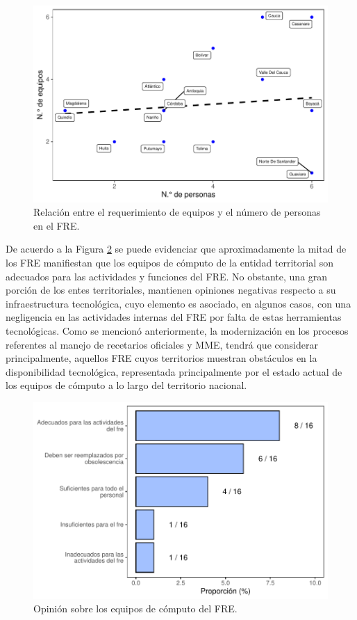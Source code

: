 \documentclass[
  oneside]{book}
\begin{document}
\begin{figure}

{\centering \includegraphics[width=0.85\linewidth]{InformeFinal_files/figure-latex/RelacionEquiposPersonal-1} 

}

\caption{Relación entre el requerimiento de equipos y el número de personas en el FRE.}\label{fig:RelacionEquiposPersonal}
\end{figure}

De acuerdo a la Figura \ref{fig:OpinionEquiposComputo} se puede evidenciar que aproximadamente la mitad de los FRE manifiestan que los equipos de cómputo de la entidad territorial son adecuados para las actividades y funciones del FRE. No obstante, una gran porción de los entes territoriales, mantienen opiniones negativas respecto a su infraestructura tecnológica, cuyo elemento es asociado, en algunos casos, con una negligencia en las actividades internas del FRE por falta de estas herramientas tecnológicas. Como se mencionó anteriormente, la modernización en los procesos referentes al manejo de recetarios oficiales y MME, tendrá que considerar principalmente, aquellos FRE cuyos territorios muestran obstáculos en la disponibilidad tecnológica, representada principalmente por el estado actual de los equipos de cómputo a lo largo del territorio nacional.

\begin{figure}

{\centering \includegraphics[width=0.85\linewidth]{InformeFinal_files/figure-latex/OpinionEquiposComputo-1} 

}

\caption{Opinión sobre los equipos de cómputo del FRE.}\label{fig:OpinionEquiposComputo}
\end{figure}
\end{document}
